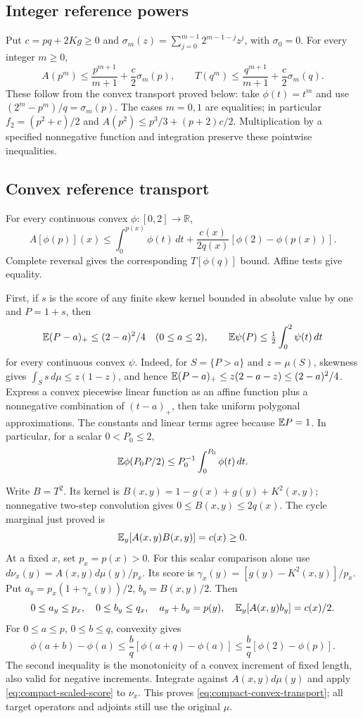 \subsection{Integer reference powers}\label{loc:S10}
Put $c=pq+2Kg\ge0$ and
$\sigma_m(z)=\sum_{j=0}^{m-1}2^{m-1-j}z^j$, with $\sigma_0=0$.
For every integer $m\ge0$,
\begin{equation}\label{eq:compact-reference-integer}
 A(p^m)\le\frac{p^{m+1}}{m+1}+\frac c2\sigma_m(p),\qquad
 T(q^m)\le\frac{q^{m+1}}{m+1}+\frac c2\sigma_m(q).
\end{equation}
These follow from the convex transport proved below: take $\phi(t)=t^m$
and use $(2^m-p^m)/q=\sigma_m(p)$. The cases $m=0,1$ are equalities;
in particular $f_2=(p^2+c)/2$ and $A(p^2)\le p^3/3+(p+2)c/2$.
Multiplication by a specified nonnegative function and integration preserve
these pointwise inequalities.

\subsection{Convex reference transport}\label{loc:S11}
For every continuous convex $\phi:[0,2]\to\mathbb R$,
\begin{equation}\label{eq:compact-convex-transport}
 A[\phi(p)](x)\le\int_0^{p(x)}\phi(t)\,dt+
 \frac{c(x)}{2q(x)}[\phi(2)-\phi(p(x))].
\end{equation}
Complete reversal gives the corresponding $T[\phi(q)]$ bound.
Affine tests give equality.

First, if $s$ is the score of any finite skew kernel bounded in absolute value by one and $P=1+s$, then
\[
 \mathbb E(P-a)_+\le(2-a)^2/4\quad(0\le a\le2),\qquad
 \mathbb E\psi(P)\le\tfrac12\int_0^2\psi(t)\,dt
\]
for every continuous convex $\psi$. Indeed, for $S=\{P>a\}$ and
$z=\mu(S)$, skewness gives $\int_Ss\,d\mu\le z(1-z)$, and hence
$\mathbb E(P-a)_+\le z(2-a-z)\le(2-a)^2/4$.
Express a convex piecewise linear function as an affine function plus
a nonnegative combination of $(t-a)_+$, then take uniform polygonal
approximations. The constants and linear terms agree because $\mathbb E P=1$.
In particular, for a scalar $0<P_0\le2$,
\begin{equation}\label{eq:compact-scaled-score}
 \mathbb E\phi(P_0P/2)\le P_0^{-1}\int_0^{P_0}\phi(t)\,dt.
\end{equation}

Write $B=T^2$. Its kernel is
$B(x,y)=1-g(x)+g(y)+K^2(x,y)$; nonnegative two-step convolution gives
$0\le B(x,y)\le2q(x)$. The cycle marginal just proved is
\[
 \mathbb E_y[A(x,y)B(x,y)]=c(x)\ge0.
\]
At a fixed $x$, set $p_x=p(x)>0$. For this scalar comparison alone use
$d\nu_x(y)=A(x,y)d\mu(y)/p_x$. Its score is
$\gamma_x(y)=[g(y)-K^2(x,y)]/p_x$. Put
$a_y=p_x(1+\gamma_x(y))/2$, $b_y=B(x,y)/2$. Then
\[
 0\le a_y\le p_x,\quad0\le b_y\le q_x,\quad
 a_y+b_y=p(y),\quad \mathbb E_y[A(x,y)b_y]=c(x)/2.
\]
For $0\le a\le p$, $0\le b\le q$, convexity gives
\[
 \phi(a+b)-\phi(a)\le\frac bq[\phi(a+q)-\phi(a)]
 \le\frac bq[\phi(2)-\phi(p)].
\]
The second inequality is the monotonicity of a convex increment of fixed
length, also valid for negative increments. Integrate against
$A(x,y)d\mu(y)$ and apply \eqref{eq:compact-scaled-score} to $\nu_x$.
This proves \eqref{eq:compact-convex-transport}; all target operators and
adjoints still use the original $\mu$.


